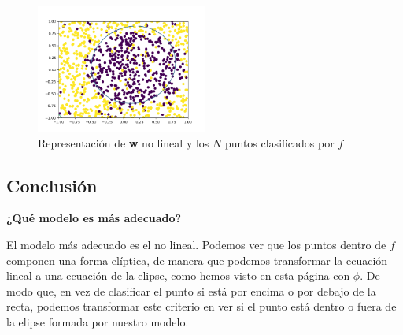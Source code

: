 \documentclass{article}
\begin{document}
    \begin{figure}[h]
        \caption{Representación de \textbf{w} no lineal y los $N$ puntos clasificados por $f$}
        \centering
        \includegraphics[width=0.5\textwidth]{Figure_7.png}
    \end{figure}

    \subsection{Conclusión}
    \textbf{¿Qué modelo es más adecuado?} \par
    El modelo más adecuado es el no lineal. Podemos ver que los puntos dentro de $f$ componen una forma
    elíptica, de manera que podemos transformar la ecuación lineal a una ecuación de la elipse, como hemos visto
    en esta página con $\phi$. De modo que, en vez de clasificar el punto si está por encima o por debajo de
    la recta, podemos transformar este criterio en ver si el punto está dentro o fuera de la elipse formada por
    nuestro modelo.
\end{document}
